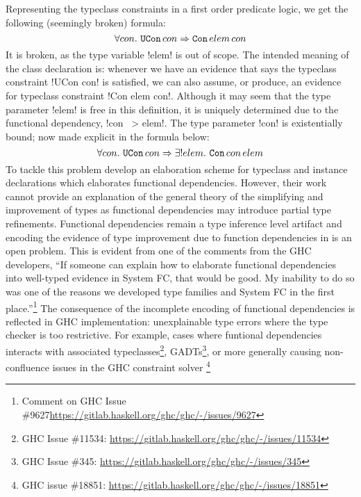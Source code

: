 \documentclass[screen,nonacm,manuscript,review]{acmart} %
\begin{document}
Representing the typeclass constraints in a first order predicate logic, we get the following
(seemingly broken) formula:
\[
\forall con.~\texttt{UCon}\, con \Rightarrow \texttt{Con}\, elem\, con
\]
It is broken, as the type variable !elem! is out of scope.
The intended meaning of the class declaration is:
whenever we have an evidence that says the typeclass constraint
!UCon con! is satisfied, we can also assume, or produce, an
evidence for typeclass constraint !Con elem con!.
Although it may seem that the type parameter
!elem! is free in this definition, it is uniquely
determined due to the functional dependency, !con ~> elem!.
The type parameter !con! is existentially
bound; now made explicit in the formula below:
\[
\forall con.~\texttt{UCon}\, con \Rightarrow \exists! elem.~\texttt{Con}\, con\, elem
\]
To tackle this problem \citet{karachalias_elaboration_2017} develop an
elaboration scheme for typeclass and instance declarations which
elaborates functional dependencies. However,
their work cannot provide an explanation of the general theory of
the simplifying and improvement of types\cite{jones_simplifying_1995}
as functional dependencies may introduce partial type
refinements. Functional dependencies remain a type inference level
artifact and encoding the evidence of type improvement due to function
dependencies in \SFC is an open problem. This is evident from one of
the comments from the GHC developers, ``If someone can explain how to
elaborate functional dependencies into well-typed evidence in System
FC, that would be good. My inability to do so was one of the reasons
we developed type families and System FC in the first
place.''\footnote{Comment on GHC Issue
  \#9627\url{https://gitlab.haskell.org/ghc/ghc/-/issues/9627}}
The consequence of the incomplete encoding of functional
dependencies is reflected in GHC implementation:
unexplainable type errors where the type checker is too
restrictive. For example, cases where funtional dependencies interacts
with associated typeclasses\footnote{GHC Issue \#11534:
  \url{https://gitlab.haskell.org/ghc/ghc/-/issues/11534}},
GADTs\footnote{GHC Issue \#345:
  \url{https://gitlab.haskell.org/ghc/ghc/-/issues/345}},
or more generally causing non-confluence issues in the GHC constraint
solver \footnote{GHC issue \#18851:
  \url{https://gitlab.haskell.org/ghc/ghc/-/issues/18851}}
\end{document}
